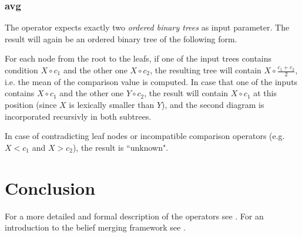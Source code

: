 \documentclass[a4paper,11pt]{article}
\theoremstyle{definition}
\begin{document}
			\subsubsection{avg}

				The operator expects exactly two \emph{ordered binary trees} as input parameter. The result will again be an ordered binary tree of the following form.
				
				For each node from the root to the leafs, if one of the input trees contains condition $X \circ c_1$ and the other one $X \circ c_2$, the resulting tree will contain
				$X \circ \frac{c_1 + c_2}{2}$, i.e. the mean of the comparison value is computed. In case that one of the inputs contains $X \circ c_1$ and the other one $Y \circ c_2$, the
				result will contain $X \circ c_1$ at this position (since $X$ is lexically smaller than $Y$), and the second diagram is incorporated recursivly in both subtrees.
				
				In case of contradicting leaf nodes or incompatible comparison operators (e.g. $X < c_1$ and $X > c_2$), the result is ``unknown".

	\section{Conclusion}
	\label{sec:Conclusion}

		For a more detailed and formal description of the operators see \cite{CR10DD}. For an introduction to the belief merging framework see \cite{CR10BMF}.

	
	
\end{document}
